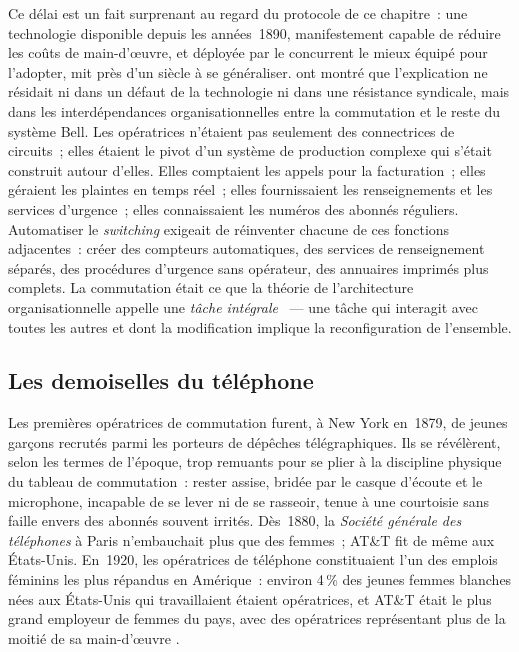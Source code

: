 %
Ce délai est un fait surprenant au regard du protocole de ce chapitre~: une technologie disponible depuis les années~1890, manifestement capable de réduire les coûts de main-d'\oe{}uvre, et déployée par le concurrent le mieux équipé pour l'adopter, mit près d'un siècle à se généraliser. \textcite{feigenbaum_organizational_2024} ont montré que l'explication ne résidait ni dans un défaut de la technologie ni dans une résistance syndicale, mais dans les interdépendances organisationnelles entre la commutation et le reste du système Bell. Les opératrices n'étaient pas seulement des connectrices de circuits~; elles étaient le pivot d'un système de production complexe qui s'était construit autour d'elles. Elles comptaient les appels pour la facturation~; elles géraient les plaintes en temps réel~; elles fournissaient les renseignements et les services d'urgence~; elles connaissaient les numéros des abonnés réguliers. Automatiser le \emph{switching} exigeait de réinventer chacune de ces fonctions adjacentes~: créer des compteurs automatiques, des services de renseignement séparés, des procédures d'urgence sans opérateur, des annuaires imprimés plus complets. La commutation était ce que la théorie de l'architecture organisationnelle appelle une \emph{tâche intégrale} \parencite{ulrich_role_1995}~--- une tâche qui interagit avec toutes les autres et dont la modification implique la reconfiguration de l'ensemble.



\subsection{Les demoiselles du téléphone}\label{subsec:demoiselles}

%
Les premières opératrices de commutation furent, à New York en~1879, de jeunes garçons recrutés parmi les porteurs de dépêches télégraphiques. Ils se révélèrent, selon les termes de l'époque, \og trop remuants\fg{} pour se plier à la discipline physique du tableau de commutation~: rester assise, bridée par le casque d'écoute et le microphone, incapable de se lever ni de se rasseoir, tenue à une courtoisie sans faille envers des abonnés souvent irrités. Dès~1880, la \emph{Société générale des téléphones} à Paris n'embauchait plus que des femmes~; AT\&T fit de même aux États-Unis. En~1920, les opératrices de téléphone constituaient l'un des emplois féminins les plus répandus en Amérique~: environ 4\,\% des jeunes femmes blanches nées aux États-Unis qui travaillaient étaient opératrices, et AT\&T était le plus grand employeur de femmes du pays, avec des opératrices représentant plus de la moitié de sa main-d'\oe{}uvre \parencite{feigenbaum_answering_2024}.

